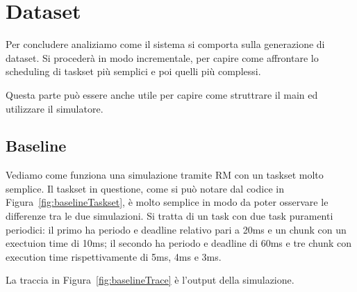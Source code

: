 \chapter{Dataset}
Per concludere analiziamo come il sistema si comporta sulla generazione di dataset. Si procederà in modo incrementale, per capire come affrontare lo scheduling di taskset più semplici e poi quelli più complessi.

Questa parte può essere anche utile per capire come struttrare il main ed utilizzare il simulatore.

\section{Baseline}
Vediamo come funziona una simulazione tramite RM con un taskset molto semplice. Il taskset in questione, come si può notare dal codice in Figura~\ref{fig:baselineTaskset}, è molto semplice in modo da poter osservare le differenze tra le due simulazioni. Si tratta di un task con due task puramenti periodici: il primo ha periodo e deadline relativo pari a 20ms e un chunk con un exectuion time di 10ms; il secondo ha periodo e deadline di 60ms e tre chunk con execution time rispettivamente di 5ms, 4ms e 3ms.

La traccia in Figura~\ref{fig:baselineTrace} è l'output della simulazione.

